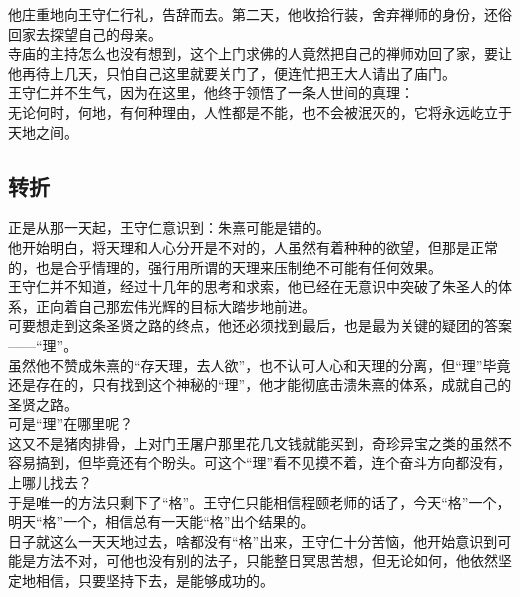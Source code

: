 \begin{multicols}{\theparacolNo}
他庄重地向王守仁行礼，告辞而去。第二天，他收拾行装，舍弃禅师的身份，还俗回家去探望自己的母亲。\\

寺庙的主持怎么也没有想到，这个上门求佛的人竟然把自己的禅师劝回了家，要让他再待上几天，只怕自己这里就要关门了，便连忙把王大人请出了庙门。\\

王守仁并不生气，因为在这里，他终于领悟了一条人世间的真理：\\

无论何时，何地，有何种理由，人性都是不能，也不会被泯灭的，它将永远屹立于天地之间。\\

\subsection{转折}
正是从那一天起，王守仁意识到：朱熹可能是错的。\\

他开始明白，将天理和人心分开是不对的，人虽然有着种种的欲望，但那是正常的，也是合乎情理的，强行用所谓的天理来压制绝不可能有任何效果。\\

王守仁并不知道，经过十几年的思考和求索，他已经在无意识中突破了朱圣人的体系，正向着自己那宏伟光辉的目标大踏步地前进。\\

可要想走到这条圣贤之路的终点，他还必须找到最后，也是最为关键的疑团的答案——“理”。\\

虽然他不赞成朱熹的“存天理，去人欲”，也不认可人心和天理的分离，但“理”毕竟还是存在的，只有找到这个神秘的“理”，他才能彻底击溃朱熹的体系，成就自己的圣贤之路。\\

可是“理”在哪里呢？\\

这又不是猪肉排骨，上对门王屠户那里花几文钱就能买到，奇珍异宝之类的虽然不容易搞到，但毕竟还有个盼头。可这个“理”看不见摸不着，连个奋斗方向都没有，上哪儿找去？\\

于是唯一的方法只剩下了“格”。王守仁只能相信程颐老师的话了，今天“格”一个，明天“格”一个，相信总有一天能“格”出个结果的。\\

日子就这么一天天地过去，啥都没有“格”出来，王守仁十分苦恼，他开始意识到可能是方法不对，可他也没有别的法子，只能整日冥思苦想，但无论如何，他依然坚定地相信，只要坚持下去，是能够成功的。\\


\end{multicols}
